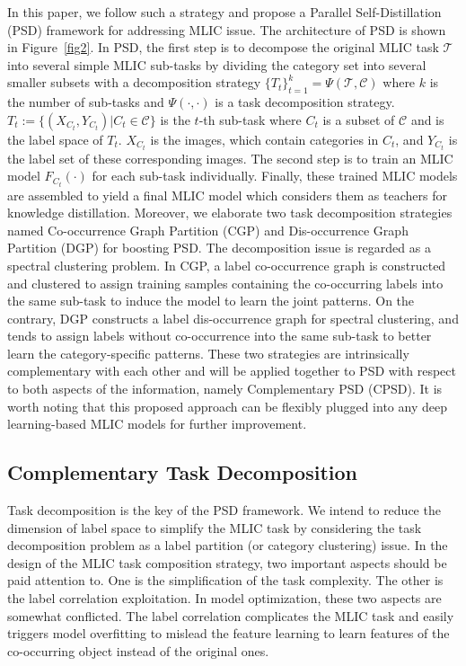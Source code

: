 \documentclass{article}
\begin{document}
In this paper, we follow such a strategy and propose a Parallel Self-Distillation (PSD) framework for addressing MLIC issue. The architecture of PSD is shown in Figure~\ref{fig2}.
In PSD, the first step is to decompose the original MLIC task $\mathcal{T}$ into several simple MLIC sub-tasks by dividing the category set into several smaller subsets with a decomposition strategy  $\{T_t\}_{t=1}^k=\Psi(\mathcal{T},\mathcal{C})$ where $k$ is the number of sub-tasks and $\Psi(\cdot,\cdot)$ is a task decomposition strategy.
$T_t:=\{(X_{C_t}, Y_{C_t})|C_t \in \mathcal{C}\}$ is the $t$-th sub-task where $C_t$ is a subset of $\mathcal{C}$ and is the label space of $T_t$. $X_{C_t}$ is the images, which contain categories in $C_t$, and $Y_{C_t}$ is the label set of these corresponding images.
The second step is to train an MLIC model $F_{C_t}(\cdot)$ for each sub-task individually.
Finally, these trained MLIC models are assembled to yield a final MLIC model which considers them as teachers for knowledge distillation.
Moreover, we elaborate two task decomposition strategies named Co-occurrence Graph Partition (CGP) and Dis-occurrence Graph Partition (DGP) for boosting PSD.
The decomposition issue is regarded as a spectral clustering problem.
In CGP, a label co-occurrence graph is constructed and clustered to assign training samples containing the co-occurring labels into the same sub-task to induce the model to learn the joint patterns.
On the contrary, DGP constructs a label dis-occurrence graph for spectral clustering, and tends to assign labels without co-occurrence into the same sub-task to better learn the category-specific patterns.
These two strategies are intrinsically complementary with each other and will be applied together to PSD with respect to both aspects of the information, namely Complementary PSD (CPSD).
It is worth noting that this proposed approach can be flexibly plugged into any deep learning-based MLIC models for further improvement.

\vspace{-0.2cm}
\subsection{Complementary Task Decomposition}
\vspace{-0.05cm}
Task decomposition is the key of the PSD framework.
We intend to reduce the dimension of label space to simplify the MLIC task by considering the task decomposition problem as a label partition (or category clustering) issue.
In the design of the MLIC task composition strategy, two important aspects should be paid attention to.
One is the simplification of the task complexity.
The other is the label correlation exploitation.
In model optimization, these two aspects are somewhat conflicted.
The label correlation complicates the MLIC task and easily triggers model overfitting to mislead the feature learning to learn features of the co-occurring object instead of the original ones.
\end{document}
